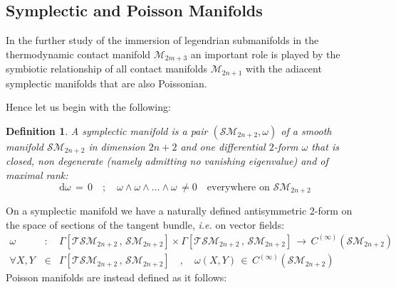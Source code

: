 \documentclass[10pt,a4paper]{article}
\newtheorem{definizione}{Definition}[section]
\begin{document}
\subsection{Symplectic and Poisson Manifolds}
\label{pescione}
In the further study of the immersion of legendrian submanifolds in the thermodynamic contact manifold $\mathcal{M}_{2m+3}$
an important role is played by the symbiotic relationship of all contact manifolds $\mathcal{M}_{2n+1}$ with the adiacent
symplectic manifolds that are also Poissonian.
\par
Hence let us begin with the following:
\begin{definizione}
\label{simp2def}
A symplectic manifold  is a pair
$\left(\mathcal{SM}_{2n+2},\omega\right)$ of a smooth manifold
$\mathcal{SM}_{2n+2}$ in dimension $2n+2$ and one differential $2$-form
$\omega$ that is closed, non degenerate (namely admitting no vanishing eigenvalue)
and of maximal  rank:
\begin{equation}\label{simplicioformo}
    \mathrm{d}\omega \, = \, 0 \quad ; \quad
    \omega\wedge\omega\wedge \dots \wedge \omega \, \neq 0 \quad
    \text{everywhere on $\mathcal{SM}_{2n+2}$}
\end{equation}
\end{definizione}
On a symplectic manifold we have a naturally defined antisymmetric 2-form on the space of sections of
the tangent bundle, \textit{i.e.} on vector fields:
\begin{eqnarray}\label{tardicchio}
    \omega &: & \Gamma\left[\mathcal{TSM}_{2n+2}\, , \,
    \mathcal{SM}_{2n+2}\right] \times \Gamma\left[\mathcal{TSM}_{2n+2}\, , \,
    \mathcal{SM}_{2n+2}\right] \, \longrightarrow \,
    C^{(\infty)}\left(\mathcal{SM}_{2n+2}\right)\nonumber\\
   \forall X,Y\, &\in & \Gamma\left[\mathcal{TSM}_{2n+2}\, , \,
    \mathcal{SM}_{2n+2}\right] \quad , \quad  \omega\left(X,Y\right) \,
    \in\,
    C^{(\infty)}\left(\mathcal{SM}_{2n+2}\right)
\end{eqnarray}
Poisson manifolds are instead defined as it follows:
\end{document}
